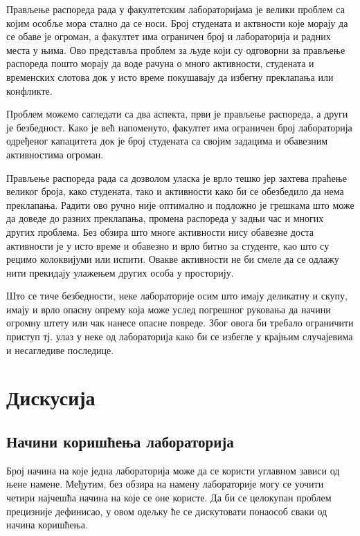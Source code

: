 \documentclass[a4paper, 12pt, diplomski]{etfcyr}
\begin{document}
		\begin{justify}
			Прављење распореда рада у факултетским лабораторијама је велики проблем са којим особље мора стално да се носи. Број студената и актвности које морају да се обаве је огроман, а факултет има ограничен број и лабораторија и радних места у њима. Ово представља проблем за људе који су одговорни за прављење распореда пошто морају да воде рачуна о много активности, студената и временских слотова док у исто време покушавају да избегну преклапања или конфликте.

			Проблем можемо сагледати са два аспекта, први је прављење распореда, а други је безбедност. Како је већ напоменуто, факултет има ограничен број лабораторија одређеног капацитета док је број студената са својим задацима и обавезним активностима огроман.

			Прављење распореда рада са дозволом уласка је врло тешко јер захтева праћење великог броја, како студената, тако и активности како би се обезбедило да нема преклапања. Радити ово ручно није оптимално и подложно је грешкама што може да доведе до разних преклапања, промена распореда у задњи час и многих других проблема. Без обзира што многе активности нису обавезне доста активности је у исто време и обавезно и врло битно за студенте, као што су рецимо колоквијуми или испити. Овакве активности не би смеле да се одлажу нити прекидају улажењем других особа у просторију.

			Што се тиче безбедности, неке лабораторије осим што имају деликатну и скупу, имају и врло опасну опрему која може услед погрешног руковања да начини огромну штету или чак нанесе опасне повреде. Због овога би требало ограничити приступ тј. улаз у неке од лабораторија како би се избегле у крајњим случајевима и несагледиве последице.
		\end{justify}

	\chapter{Дискусија}

		\section{Начини коришћења лабораторија}

			\begin{justify}
				Број начина на које једна лабораторија може да се користи углавном зависи од њене намене. Међутим, без обзира на намену лабораторије могу се уочити четири најчешћа начина на које се оне користе. Да би се целокупан проблем прецизније дефинисао, у овом одељку ће се дискутовати понаособ сваки од начина коришћења.
			\end{justify}
\end{document}
